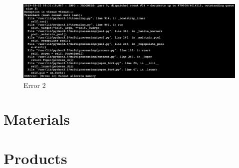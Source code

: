 \begin{figure}[htbp]
\centering
\includegraphics[width=\linewidth]{99-imgs/gensim_memory_allocation_error}
\caption{Error 2}
\label{fig:error-2}
\end{figure}

\section{Materials}

\section{Products}




